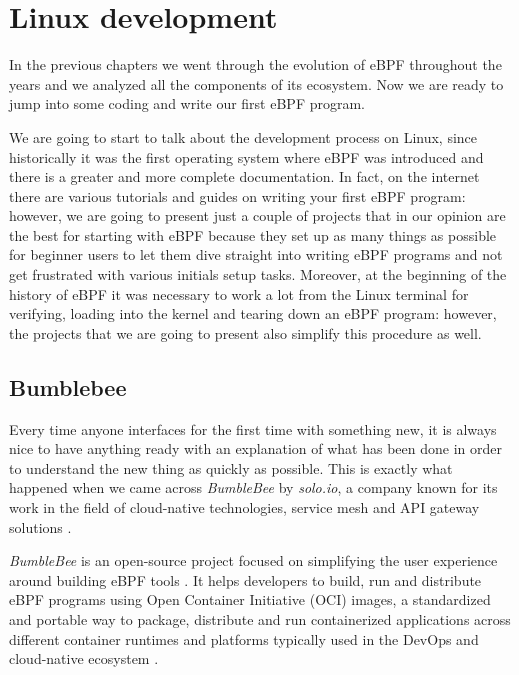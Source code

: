 \chapter{Linux development}

In the previous chapters we went through the evolution of eBPF throughout the years and we analyzed all the components of its ecosystem.
Now we are ready to jump into some coding and write our first eBPF program.

We are going to start to talk about the development process on Linux, since historically it was the first operating system where eBPF was introduced and there is a greater and more complete documentation.
In fact, on the internet there are various tutorials and guides on writing your first eBPF program: however, we are going to present just a couple of projects that in our opinion are the best for starting with eBPF because they set up as many things as possible for beginner users to let them dive straight into writing eBPF programs and not get frustrated with various initials setup tasks.
Moreover, at the beginning of the history of eBPF it was necessary to work a lot from the Linux terminal for verifying, loading into the kernel and tearing down an eBPF program: however, the projects that we are going to present also simplify this procedure as well.

\section{Bumblebee}






Every time anyone interfaces for the first time with something new, it is always nice to have anything ready with an explanation of what has been done in order to understand the new thing as quickly as possible.
This is exactly what happened when we came across \textit{BumbleBee} \cite{BumbleBeeWebsite} by \textit{solo.io}, a company known for its work in the field of cloud-native technologies, service mesh and API gateway solutions \cite{soloioWebsite}.

\textit{BumbleBee} is an open-source project focused on simplifying the user experience around building eBPF tools \cite{BumbleBeeRepo}. 
It helps developers to build, run and distribute eBPF programs using Open Container Initiative (OCI) images, a standardized and portable way to package, distribute and run containerized applications across different container runtimes and platforms typically used in the DevOps and cloud-native ecosystem \cite{OCIRepo}.

